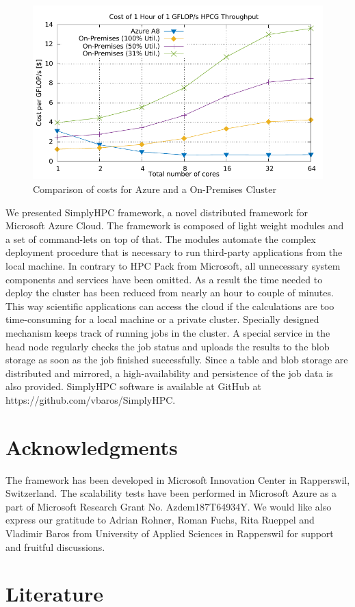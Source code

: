 \documentclass[3p,times]{elsarticle}
\begin{document}
\begin{figure}
	\centering
	\includegraphics[width=.5\linewidth]{gplt-cost}
	\caption{Comparison of costs for Azure and a On-Premises Cluster}
	\label{fig:costs}
\end{figure}

We presented SimplyHPC framework, a novel distributed framework for Microsoft Azure Cloud. The framework is composed of light weight modules and a set of command-lets on top of that. The modules automate the complex deployment procedure that is necessary to run third-party applications from the local machine. In contrary to HPC Pack from Microsoft, all unnecessary system components and services have been omitted. As a result the time needed to deploy the cluster has been reduced from nearly an hour to couple of minutes.  This way scientific applications can access the cloud if the calculations are too time-consuming for a local machine or a private cluster. Specially designed mechanism keeps track of running jobs in the cluster. A special service in the head node regularly checks the job status and uploads the results to the blob storage as soon as the job finished successfully. Since a table and blob storage are distributed and mirrored, a high-availability and persistence of the job data is also provided. SimplyHPC software is available at GitHub at https://github.com/vbaros/SimplyHPC.






\section{Acknowledgments}
\label{sec:ackn}

The framework has been developed in Microsoft Innovation Center in Rapperswil, Switzerland. The scalability tests have been performed in Microsoft Azure as a part of Microsoft Research Grant No. Azdem187T64934Y. We would like also express our gratitude to Adrian Rohner, Roman Fuchs, Rita Rueppel and Vladimir Baros from University of Applied Sciences in Rapperswil for support and fruitful discussions.

\section{Literature}
\label{sec:literature}



\end{document}
